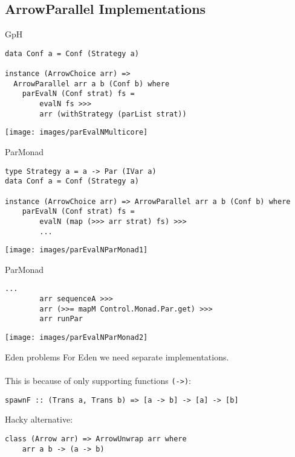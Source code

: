 \subsection{ArrowParallel Implementations}
\begin{frame}[fragile]{GpH}
\begin{lstlisting}[frame=htrbl]
data Conf a = Conf (Strategy a)

instance (ArrowChoice arr) =>
  ArrowParallel arr a b (Conf b) where
    parEvalN (Conf strat) fs =
        evalN fs >>>
        arr (withStrategy (parList strat))
\end{lstlisting}
\begin{center}
\texttt{[image: images/parEvalNMulticore]}
\end{center}
\end{frame}

\begin{frame}[fragile]{ParMonad}
\begin{lstlisting}[frame=htrbl]
type Strategy a = a -> Par (IVar a)
data Conf a = Conf (Strategy a)

instance (ArrowChoice arr) => ArrowParallel arr a b (Conf b) where
    parEvalN (Conf strat) fs =
        evalN (map (>>> arr strat) fs) >>>
        ...
\end{lstlisting}
\begin{center}
\texttt{[image: images/parEvalNParMonad1]}
\end{center}
\end{frame}

\begin{frame}[fragile]{ParMonad}
\begin{lstlisting}[frame=htrbl]
        ...
        arr sequenceA >>>
        arr (>>= mapM Control.Monad.Par.get) >>>
        arr runPar
\end{lstlisting}
\begin{center}
\texttt{[image: images/parEvalNParMonad2]}
\end{center}
\end{frame}


\begin{frame}[fragile]{Eden problems}
For Eden we need separate implementations.\\~\\
This is because of  only supporting functions \lstinline{(->)}:
\begin{lstlisting}[frame=htrbl]
spawnF :: (Trans a, Trans b) => [a -> b] -> [a] -> [b]
\end{lstlisting}
\pause
Hacky alternative:
\begin{lstlisting}[frame=htrbl]
class (Arrow arr) => ArrowUnwrap arr where
    arr a b -> (a -> b)
\end{lstlisting}
\end{frame}

